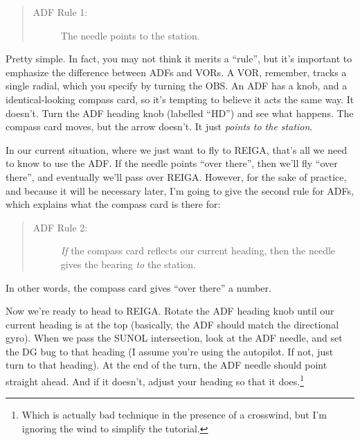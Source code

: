 \begin{quote}
  \begin{description}
  \item[ADF Rule 1:] The needle points to the station.
  \end{description}
\end{quote}

Pretty simple.  In fact, you may not think it merits a ``rule'', but
it's important to emphasize the difference between ADFs and VORs.  A
VOR, remember, tracks a single radial, which you specify by turning
the OBS.  An ADF has a knob, and a identical-looking compass card, so
it's tempting to believe it acts the same way.  It doesn't.  Turn the
ADF heading knob (labelled ``HD'') and see what happens.  The compass
card moves, but the arrow doesn't.  It just \emph{points to the
  station}.

In our current situation, where we just want to fly to REIGA, that's
all we need to know to use the ADF.  If the needle points ``over
there'', then we'll fly ``over there'', and eventually we'll pass over
REIGA.  However, for the sake of practice, and because it will be
necessary later, I'm going to give the second rule for ADFs, which
explains what the compass card is there for:

\begin{quote}
  \begin{description}
  \item[ADF Rule 2:] \emph{If} the compass card reflects our current
    heading, then the needle gives the bearing \emph{to} the station.
  \end{description}
\end{quote}

In other words, the compass card gives ``over there'' a number.


Now we're ready to head to REIGA.  Rotate the ADF heading knob until
our current heading is at the top (basically, the ADF should match the
directional gyro).  When we pass the SUNOL intersection, look at the
ADF needle, and set the DG bug to that heading (I assume you're using
the autopilot.  If not, just turn to that heading).  At the end of the
turn, the ADF needle should point straight
ahead. And if it
doesn't, adjust your heading so that it does.\footnote{Which is
  actually bad technique in the presence of a crosswind, but I'm
  ignoring the wind to simplify the tutorial.}

